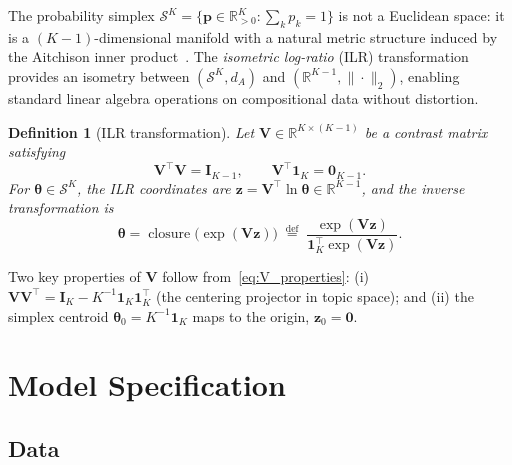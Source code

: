 \documentclass{article}
\newtheorem{definition}{Definition}
\DeclareMathOperator{\closure}{closure}
\begin{document}
The probability simplex
$\mathcal{S}^K = \bigl\{\mathbf{p}\in\mathbb{R}^K_{>0}:\sum_k p_k=1\bigr\}$
is not a Euclidean space: it is a $(K{-}1)$-dimensional manifold with a
natural metric structure induced by the Aitchison inner
product~\citep{aitchison1986statistical}. The \emph{isometric log-ratio}
(ILR) transformation~\citep{egozcue2003isometric} provides an isometry
between $(\mathcal{S}^K, d_A)$ and $(\mathbb{R}^{K-1}, \|\cdot\|_2)$,
enabling standard linear algebra operations on compositional data
without distortion.

\begin{definition}[ILR transformation]
\label{def:ilr}
Let $\mathbf{V}\in\mathbb{R}^{K\times(K{-}1)}$ be a \emph{contrast
matrix} satisfying
\begin{equation}
  \mathbf{V}^{\!\top}\mathbf{V} = \mathbf{I}_{K-1},
  \qquad
  \mathbf{V}^{\!\top}\mathbf{1}_K = \mathbf{0}_{K-1}.
  \label{eq:V_properties}
\end{equation}
For $\boldsymbol{\theta}\in\mathcal{S}^K$, the ILR coordinates are
$\mathbf{z} = \mathbf{V}^{\!\top}\ln\boldsymbol{\theta}
 \in\mathbb{R}^{K-1}$,
and the inverse transformation is
\begin{equation}
  \boldsymbol{\theta}
  = \closure\!\bigl(\exp(\mathbf{V}\mathbf{z})\bigr)
  \;\stackrel{\text{def}}{=}\;
  \frac{\exp(\mathbf{V}\mathbf{z})}
       {\mathbf{1}_K^{\!\top}\exp(\mathbf{V}\mathbf{z})}.
  \label{eq:ilr_inverse}
\end{equation}
\end{definition}

\noindent
Two key properties of $\mathbf{V}$ follow
from~\eqref{eq:V_properties}: (i) $\mathbf{V}\mathbf{V}^{\!\top}
= \mathbf{I}_K - K^{-1}\mathbf{1}_K\mathbf{1}_K^{\!\top}$
(the centering projector in topic space); and (ii) the simplex centroid
$\boldsymbol{\theta}_0 = K^{-1}\mathbf{1}_K$ maps to the origin,
$\mathbf{z}_0 = \mathbf{0}$.

\section{Model Specification}
\label{sec:model}

\subsection{Data}
\end{document}
